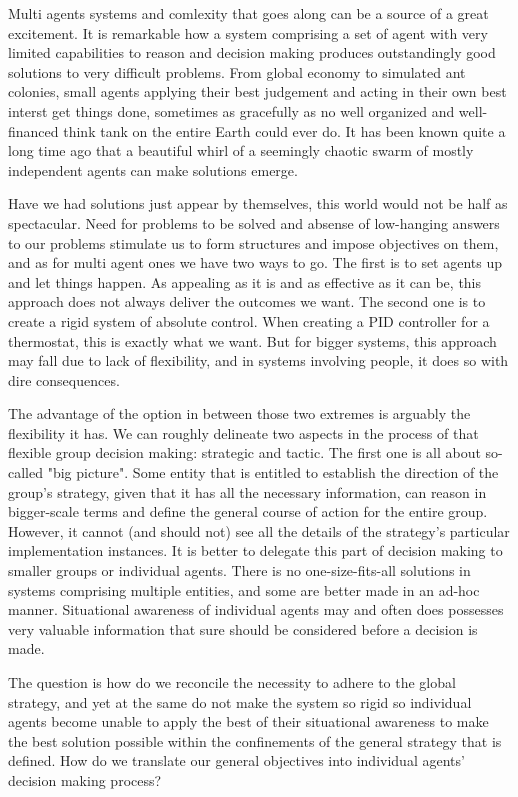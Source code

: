 Multi agents systems and comlexity that goes along can be a source of a great excitement. It is remarkable how a system
comprising a set of agent with very limited capabilities to reason and decision making produces outstandingly good
solutions to very difficult problems. From global economy to simulated ant colonies, small agents applying their best
judgement and acting in their own best interst get things done, sometimes as gracefully as no well organized and
well-financed think tank on the entire Earth could ever do. It has been known quite a long time ago that a beautiful
whirl of a seemingly chaotic swarm of mostly independent agents can make solutions emerge.

Have we had solutions just appear by themselves, this world would not be half as spectacular. Need for problems to be
solved and absense of low-hanging answers to our problems stimulate us to form structures and impose objectives on them,
and as for multi agent ones we have two ways to go. The first is to set agents up and let things happen. As appealing as
it is and as
effective as it can be, this approach does not always deliver the outcomes we want. The second one is to create a rigid
system of absolute control. When creating a PID controller for a thermostat, this is exactly what we want. But for
bigger systems, this approach may fall due to lack of flexibility, and in systems involving people, it
does so with dire consequences.

The advantage of the option in between those two extremes is arguably the flexibility it has. We can roughly delineate
two aspects in the process of that flexible group decision making: strategic and tactic. The first one is all about
so-called "big picture". Some entity that is entitled to establish the direction of the group's strategy, given that it
has all the necessary information, can reason in bigger-scale terms and define the general course of action for the
entire group. However, it cannot (and should not) see all the details of the strategy's particular implementation
instances. It is better to delegate this part of decision making to smaller groups or individual agents. There is no
one-size-fits-all solutions in systems comprising multiple entities, and some are better made in an ad-hoc manner.
Situational awareness of individual agents may and often does possesses very valuable information that sure should be
considered before a decision is made.

The question is how do we reconcile the necessity to adhere to the global strategy, and yet at the same do not make the
system so rigid so individual agents become unable to apply the best of their situational awareness to make the best
solution possible within the confinements of the general strategy that is defined. How do we translate our general
objectives into individual agents' decision making process?
